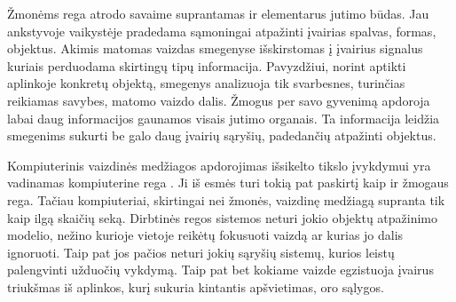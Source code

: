 \documentclass[a4paper,12pt]{article}
\begin{document}
Žmonėms rega atrodo savaime suprantamas ir elementarus jutimo būdas. Jau ankstyvoje vaikystėje pradedama sąmoningai atpažinti įvairias spalvas, formas, objektus. Akimis matomas vaizdas smegenyse išskirstomas į įvairius signalus kuriais perduodama skirtingų tipų informacija. Pavyzdžiui, norint aptikti aplinkoje konkretų objektą, smegenys analizuoja tik svarbesnes, turinčias reikiamas savybes, matomo vaizdo dalis. Žmogus per savo gyvenimą apdoroja labai daug informacijos gaunamos visais jutimo organais. Ta informacija leidžia smegenims sukurti be galo daug įvairių sąryšių, padedančių atpažinti objektus.

Kompiuterinis vaizdinės medžiagos apdorojimas išsikelto tikslo įvykdymui yra vadinamas kompiuterine rega \cite{OPENCV}. Ji iš esmės turi tokią pat paskirtį kaip ir žmogaus rega. Tačiau kompiuteriai, skirtingai nei žmonės, vaizdinę medžiagą supranta tik kaip ilgą skaičių seką. Dirbtinės regos sistemos neturi jokio objektų atpažinimo modelio, nežino kurioje vietoje reikėtų fokusuoti vaizdą ar kurias jo dalis ignoruoti. Taip pat jos pačios neturi jokių sąryšių sistemų, kurios leistų palengvinti užduočių vykdymą. Taip pat bet kokiame vaizde egzistuoja įvairus triukšmas iš aplinkos, kurį sukuria kintantis apšvietimas, oro sąlygos.
\end{document}
